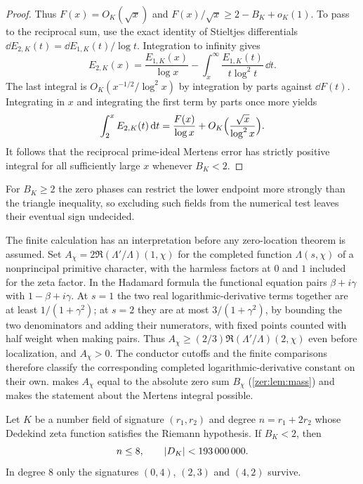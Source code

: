 \begin{proof}
Thus $F(x)=O_K(\sqrt x)$ and $F(x)/\sqrt x\ge2-B_K+o_K(1)$. To pass to the reciprocal sum,
use the exact identity of Stieltjes differentials
$\dd E_{2,K}(t)=\dd E_{1,K}(t)/\log t$. Integration to infinity gives
\[
 E_{2,K}(x)=\frac{E_{1,K}(x)}{\log x}-\int_x^\infty\frac{E_{1,K}(t)}{t\log^2t}\,\dd t .
\]
The last integral is $O_K(x^{-1/2}/\log^2x)$ by integration by parts against $\dd F(t)$.
Integrating in $x$ and integrating the first term by parts once more yields
\[
 \int_2^xE_{2,K}(t)\,\mathrm{d} t=\frac{F(x)}{\log x}+O_K\Bigl(\frac{\sqrt x}{\log^2x}\Bigr).
\]
It follows that the reciprocal prime-ideal Mertens error has strictly positive integral for
all sufficiently large $x$ whenever $B_K<2$.
\end{proof}

For $B_K\ge2$ the zero phases can restrict the lower endpoint more strongly than the
triangle inequality, so excluding such fields from the numerical test leaves their eventual
sign undecided.

\begin{remark}\label{zer:rem:needsGRH}
The finite calculation has an interpretation before any zero-location theorem is assumed.
Set $A_\chi=2\Re(\Lambda'/\Lambda)(1,\chi)$ for the completed function $\Lambda(s,\chi)$ of
a nonprincipal primitive character, with the harmless factors at $0$ and $1$ included for
the zeta factor. In the Hadamard formula the functional equation pairs $\beta+i\gamma$ with
$1-\beta+i\gamma$. At $s=1$ the two real logarithmic-derivative terms together are at
least $1/(1+\gamma^2)$; at $s=2$ they are at most $3/(1+\gamma^2)$, by bounding the two
denominators and adding their numerators, with fixed points counted with half weight when
making pairs. Thus $A_\chi\ge(2/3)\Re(\Lambda'/\Lambda)(2,\chi)$ even before localization,
and $A_\chi>0$. The conductor cutoffs and the finite comparisons therefore classify the
corresponding completed logarithmic-derivative constant on their own.
 makes $A_\chi$ equal to the absolute zero sum $B_\chi$
(\cref{zer:lem:mass}) and makes the
statement about the Mertens integral possible.
\end{remark}

\begin{proposition}\label{zer:prop:frontier}
Let $K$ be a number field of signature $(r_1,r_2)$ and degree $n=r_1+2r_2$ whose Dedekind
zeta function satisfies the Riemann hypothesis. If $B_K<2$, then
\[
 n\le8,\qquad\lvert D_K\rvert<193\,000\,000 .
\]
In degree $8$ only the signatures $(0,4)$, $(2,3)$ and $(4,2)$ survive.
\end{proposition}

